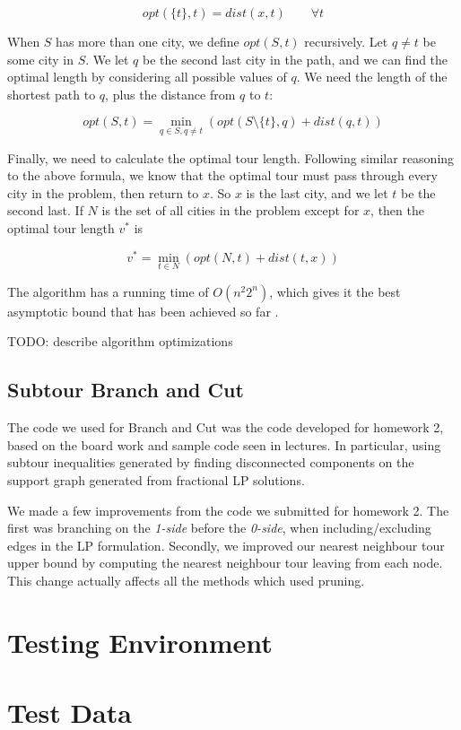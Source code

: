 \documentclass[11pt]{article}
\begin{document}
\[ opt(\{ t \}, t) = dist(x,t) \qquad \forall t \]

When $S$ has more than one city, we define $opt(S,t)$ recursively. Let $q \neq t$ be some city in $S$. We let $q$ be the second last city in the path, and we can find the optimal length by considering all possible values of $q$. We need the length of the shortest path to $q$, plus the distance from $q$ to $t$:

\[ opt(S,t) = \min_{q \in S, q \neq t} ( opt(S \setminus \{ t \} , q) + dist(q, t) ) \]

Finally, we need to calculate the optimal tour length. Following similar reasoning to the above formula, we know that the optimal tour must pass through every city in the problem, then return to $x$. So $x$ is the last city, and we let $t$ be the second last. If $N$ is the set of all cities in the problem except for $x$, then the optimal tour length $v^*$ is

\[ v^* = \min_{t \in N} ( opt(N , t) + dist(t, x) ) \]

The algorithm has a running time of $O(n^2 2^n)$, which gives it the best asymptotic bound that has been achieved so far \cite{bico}.

TODO: describe algorithm optimizations

\subsection{Subtour Branch and Cut}

The code we used for Branch and Cut was the code developed for homework 2, based on the board work and sample code seen in lectures. In particular, using subtour inequalities generated by finding disconnected components on the support graph generated from fractional LP solutions.

We made a few improvements from the code we submitted for homework 2. The first was branching on the \emph{1-side} before the \emph{0-side}, when including/excluding edges in the LP formulation. Secondly, we improved our nearest neighbour tour upper bound by computing the nearest neighbour tour leaving from each node. This change actually affects all the methods which used pruning. 

\section{Testing Environment}
\label{sec:environment}

\section{Test Data}
\label{sec:data}
\end{document}
